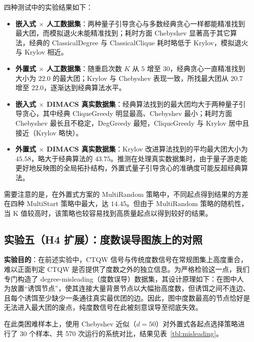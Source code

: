 \documentclass[pre,twocolumn]{revtex4-2}
\begin{document}
四种测试中的实验结果如下：
\begin{itemize}
    \item \textbf{嵌入式 $\times$ 人工数据集}：两种量子引导贪心与多数经典贪心一样都能精准找到最大团，而模拟退火未能精准找到；耗时方面 Chebyshev 显著高于其它算法，经典的 ClassicalDegree 与 ClassicalClique 耗时略低于 Krylov，模拟退火与 Krylov 相近。
    \item \textbf{外置式 $\times$ 人工数据集}：随重启次数 $K$ 从 $5$ 增至 $30$，经典贪心一直精准找到大小为 $22.0$ 的最大团；Krylov 与 Chebyshev 表现一致，所找最大团从 $20.7$ 增至 $22.0$，逐渐达到经典算法水平。
    \item \textbf{嵌入式 $\times$ DIMACS 真实数据集}：经典算法找到的最大团均大于两种量子引导贪心，其中经典 CliqueGreedy 明显最高、Chebyshev 最小；耗时方面 Chebyshev 最长且不稳定，DegGreedy 最短，CliqueGreedy 与 Krylov 居中且接近（Krylov 略快）。
    \item \textbf{外置式 $\times$ DIMACS 真实数据集}：Krylov 改进算法找到的平均最大团大小为 $45.58$，略大于经典算法的 $43.75$。推测在处理真实数据集时，由于量子游走能更好地反映图的全局拓扑结构，外置式量子引导贪心的准确度可能反超经典算法。
\end{itemize}

需要注意的是，在外置式方案的 MultiRandom 策略中，不同起点得到结果的方差在四种 MultiStart 策略中最大，达 $14.45$。但由于 MultiRandom 策略的随机性，当 K 值较高时，该策略也较容易找到高质量起点以得到较好的结果。

\subsection{实验五（H4 扩展）：度数误导图族上的对照}

\textbf{实验目的}：在前述实验中，CTQW 信号与传统度数信号在常规图集上高度重合，难以正面判定 CTQW 是否提供了度数之外的独立信息。为严格检验这一点，我们专门构造了 degree-misleading（度数误导）数据集，其设计原理如下：在图中人为放置``诱饵节点''，使其连接大量背景节点以大幅抬高度数，但诱饵之间不连边、且每个诱饵至少缺少一条通往真实最优团的边。因此，图中度数最高的节点恰好是无法进入最大团的废点，纯度数信号在此被刻意误导至彻底失效。

在此类困难样本上，使用 Chebyshev 近似（$d=50$）对外置式各起点选择策略进行了 30 个样本、共 570 次运行的系统对比，结果见表~\ref{tbl:misleading}。
\end{document}
